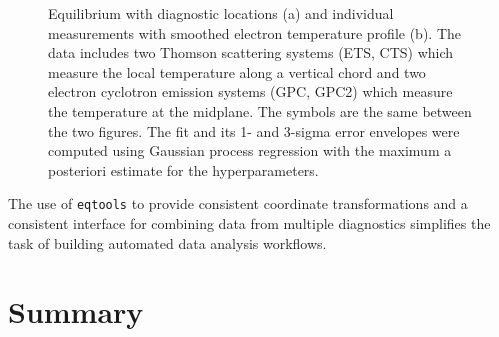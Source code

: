 \documentclass[12pt,floatfix,showpacs]{revtex4-1}
\newcommand{\eqtools}{\texttt{eqtools}\xspace}
\begin{document}
\begin{figure}
	\caption{Equilibrium with diagnostic locations (a) and individual measurements with smoothed electron temperature profile (b). The data includes two Thomson scattering systems (ETS, CTS) which measure the local temperature along a vertical chord and two electron cyclotron emission systems (GPC, GPC2) which measure the temperature at the midplane. The symbols are the same between the two figures. The fit and its 1- and 3-sigma error envelopes were computed using Gaussian process regression with the maximum a posteriori estimate for the hyperparameters.}
	\label{fig:profiledemo}
\end{figure}
The use of \eqtools to provide consistent coordinate transformations and a consistent interface for combining data from multiple diagnostics simplifies the task of building automated data analysis workflows.

\section{Summary}\label{sec:summary}
\end{document}
